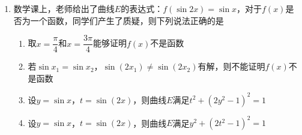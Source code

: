\documentclass[11pt,a4paper]{ctexart}
\begin{document}
\begin{enumerate}
    \item 数学课上，老师给出了曲线$E$的表达式：$f(\sin 2x)=\sin x$，对于$f(x)$是否为一个函数，同学们产生了质疑，则下列说法正确的是
    \begin{enumerate}[label=(\Alph*)]
        \item 取$x=\dfrac{\pi}{4}$和$x=\dfrac{3\pi}{4}$能够证明$f(x)$不是函数
        \item 若$\sin x_1=\sin x_2$，$\sin (2x_1)\neq \sin (2x_2)$有解，则不能证明$f(x)$不是函数
        \item 设$y=\sin x$，$t=\sin (2x)$，则曲线$E$满足$t^2+(2y^2-1)^2=1$
        \item 设$y=\sin x$，$t=\sin (2x)$，则曲线$E$满足$y^2+(2t^2-1)^2=1$
    \end{enumerate}
\end{enumerate}
\end{document}
